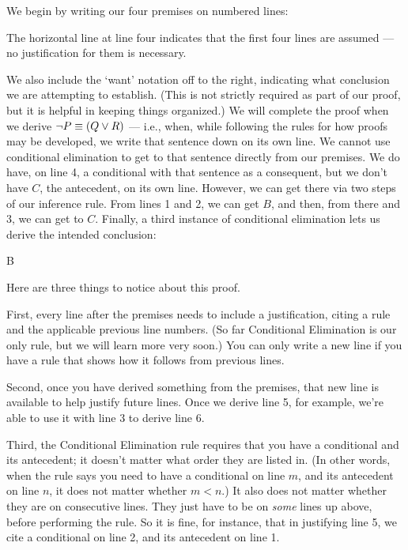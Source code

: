 We begin by writing our four premises on numbered lines:

\begin{ndproof}
	 
\end{ndproof}

The horizontal line at line four indicates that the first four lines are assumed --- no justification for them is necessary.

We also include the `want' notation off to the right, indicating what conclusion we are attempting to establish. (This is not strictly required as part of our proof, but it is helpful in keeping things organized.) We will complete the proof when we derive $\neg P \equiv (Q \vee R)$ --- i.e., when, while following the rules for how proofs may be developed, we write that sentence down on its own line. We cannot use conditional elimination to get to that sentence directly from our premises. We do have, on line 4, a conditional with that sentence as a consequent, but we don't have $C$, the antecedent, on its own line. However, we can get there via two steps of our inference rule. From lines 1 and 2, we can get $B$, and then, from there and 3, we can get to $C$. Finally, a third instance of conditional elimination lets us derive the intended conclusion:

\begin{ndproof}
	 
	 {B} 
	 
	 
\end{ndproof}

Here are three things to notice about this proof.

First, every line after the premises needs to include a justification, citing a rule and the applicable previous line numbers. (So far Conditional Elimination is our only rule, but we will learn more very soon.) You can only write a new line if you have a rule that shows how it follows from previous lines.

Second, once you have derived something from the premises, that new line is available to help justify future lines. Once we derive line 5, for example, we're able to use it with line 3 to derive line 6.

Third, the Conditional Elimination rule requires that you have a conditional and its antecedent; it doesn't matter what order they are listed in. (In other words, when the rule says you need to have a conditional on line $m$, and its antecedent on line $n$, it does not matter whether $m<n$.) It also does not matter whether they are on consecutive lines. They just have to be on \emph{some} lines up above, before performing the rule.  So it is fine, for instance, that in justifying line 5, we cite a conditional on line 2, and its antecedent on line 1.


